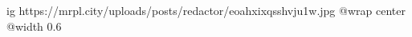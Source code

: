  
 
 
 
 

\ifcmt
  ig https://mrpl.city/uploads/posts/redactor/eoahxixqsshvju1w.jpg
  @wrap center
  @width 0.6
\fi
